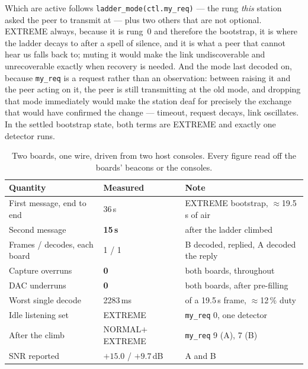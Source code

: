 Which are active follows \texttt{ladder\_mode(ctl.my\_req)} --- the rung
\emph{this} station asked the peer to transmit at --- plus two others
that are not optional. EXTREME always, because it is rung~0 and
therefore the bootstrap, it is where the ladder decays to after a spell
of silence, and it is what a peer that cannot hear us falls back to;
muting it would make the link undiscoverable and unrecoverable exactly
when recovery is needed. And the mode last decoded on, because
\texttt{my\_req} is a request rather than an observation: between raising
it and the peer acting on it, the peer is still transmitting at the old
mode, and dropping that mode immediately would make the station deaf for
precisely the exchange that would have confirmed the change --- timeout,
request decays, link oscillates. In the settled bootstrap state, both
terms are EXTREME and exactly one detector runs.

\begin{table}[H]
    \centering
    \caption{Two boards, one wire, driven from two host consoles. Every
             figure read off the boards' beacons or the consoles.}
    \label{tab:radio}
    \small
    \begin{tabular}{@{}lll@{}}
    \toprule
    \textbf{Quantity} & \textbf{Measured} & \textbf{Note} \\
    \midrule
    First message, end to end & 36\,s & EXTREME bootstrap,
                                        $\approx$19.5\,s of air \\
    Second message            & \textbf{15\,s} & after the ladder
                                                 climbed \\
    Frames / decodes, each board & 1 / 1 & B decoded, replied, A decoded
                                           the reply \\
    Capture overruns          & \textbf{0} & both boards, throughout \\
    DAC underruns             & \textbf{0} & both boards, after
                                             pre-filling \\
    Worst single decode       & 2283\,ms & of a 19.5\,s frame,
                                           $\approx$12\,\% duty \\
    Idle listening set        & EXTREME & \texttt{my\_req} 0, one
                                          detector \\
    After the climb           & NORMAL$+$EXTREME & \texttt{my\_req} 9
                                                   (A), 7 (B) \\
    SNR reported              & $+15.0$ / $+9.7$\,dB & A and B \\
    \bottomrule
    \end{tabular}
\end{table}

